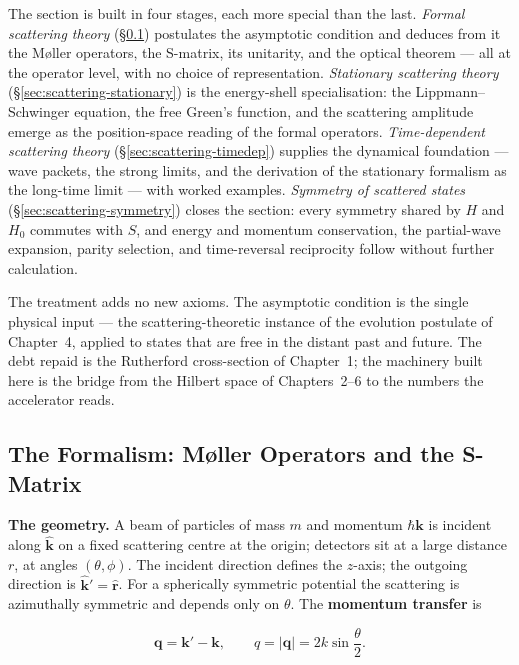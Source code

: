 The section is built in four stages, each more special than the last. \emph{Formal scattering theory} (\S\ref{sec:scattering-formalism-moller}) postulates the asymptotic condition and deduces from it the M\o{}ller operators, the S-matrix, its unitarity, and the optical theorem --- all at the operator level, with no choice of representation. \emph{Stationary scattering theory} (\S\ref{sec:scattering-stationary}) is the energy-shell specialisation: the Lippmann--Schwinger equation, the free Green's function, and the scattering amplitude emerge as the position-space reading of the formal operators. \emph{Time-dependent scattering theory} (\S\ref{sec:scattering-timedep}) supplies the dynamical foundation --- wave packets, the strong limits, and the derivation of the stationary formalism as the long-time limit --- with worked examples. \emph{Symmetry of scattered states} (\S\ref{sec:scattering-symmetry}) closes the section: every symmetry shared by $H$ and $H_{0}$ commutes with $S$, and energy and momentum conservation, the partial-wave expansion, parity selection, and time-reversal reciprocity follow without further calculation.

The treatment adds no new axioms. The asymptotic condition is the single physical input --- the scattering-theoretic instance of the evolution postulate of Chapter~4, applied to states that are free in the distant past and future. The debt repaid is the Rutherford cross-section of Chapter~1; the machinery built here is the bridge from the Hilbert space of Chapters~2--6 to the numbers the accelerator reads.

\subsection{The Formalism: M\o{}ller Operators and the S-Matrix}
\label{sec:scattering-formalism-moller}

\medskip\noindent\textbf{The geometry.} A beam of particles of mass $m$ and momentum $\hbar\bm k$ is incident along $\hat{\bm k}$ on a fixed scattering centre at the origin; detectors sit at a large distance $r$, at angles $(\theta,\phi)$. The incident direction defines the $z$-axis; the outgoing direction is $\hat{\bm k}'=\hat{\bm r}$. For a spherically symmetric potential the scattering is azimuthally symmetric and depends only on $\theta$. The \textbf{momentum transfer} is
\begin{linenomath}
\begin{equation}
\bm q = \bm k' - \bm k,\qquad q = |\bm q| = 2k\sin\frac{\theta}{2}.
\label{eq:momentum-transfer}
\end{equation}
\end{linenomath}

